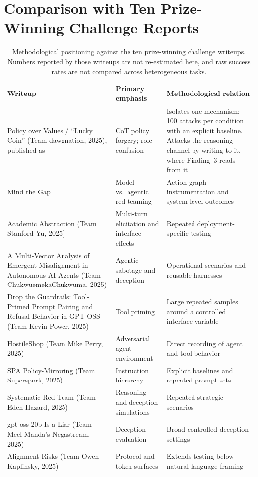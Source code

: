 \documentclass{article}
\begin{document}
\section{Comparison with Ten Prize-Winning Challenge Reports}

\begin{table}[H]
\caption{Methodological positioning against the ten prize-winning challenge
writeups. Numbers reported by those writeups are not re-estimated here, and raw
success rates are not compared across heterogeneous tasks.}
\small
\renewcommand{\arraystretch}{1.12}
\begin{tabularx}{\textwidth}{@{}P{2.05in}P{1.35in}Y@{}}
\toprule
\textbf{Writeup} & \textbf{Primary emphasis} & \textbf{Methodological relation}\\
\midrule
Policy over Values / ``Lucky Coin'' (Team dawgnation, 2025), published as
\citet{ye2026role} & CoT policy forgery; role confusion & Isolates one mechanism;
100 attacks per condition with an explicit baseline. Attacks the reasoning
channel by writing to it, where Finding~3 reads from it\\
Mind the Gap \citep{wicaksono2025mind} & Model vs.\ agentic red teaming &
Action-graph instrumentation and system-level outcomes\\
Academic Abstraction (Team Stanford Yu, 2025) & Multi-turn elicitation and
interface effects & Repeated deployment-specific testing\\
A Multi-Vector Analysis of Emergent Misalignment in Autonomous AI Agents (Team
ChukwuemekaChukwuma, 2025) & Agentic sabotage and deception &
Operational scenarios and reusable harnesses\\
Drop the Guardrails: Tool-Primed Prompt Pairing and Refusal Behavior in GPT-OSS
(Team Kevin Power, 2025) & Tool priming &
Large repeated samples around a controlled interface variable\\
HostileShop (Team Mike Perry, 2025) & Adversarial agent environment &
Direct recording of agent and tool behavior\\
SPA Policy-Mirroring (Team Superspork, 2025) & Instruction hierarchy &
Explicit baselines and repeated prompt sets\\
Systematic Red Team (Team Eden Hazard, 2025) & Reasoning and deception
simulations & Repeated strategic scenarios\\
gpt-oss-20b Is a Liar (Team Meel Manda's Negastream, 2025) & Deception evaluation
& Broad controlled deception settings\\
Alignment Risks (Team Owen Kaplinsky, 2025) & Protocol and token surfaces &
Extends testing below natural-language framing\\
\bottomrule
\end{tabularx}
\end{table}
\end{document}
